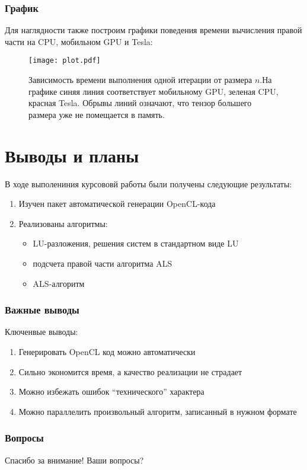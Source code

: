 \documentclass[presentation]{beamer}
\begin{document}
\begin{frame}
\frametitle{График}
\label{sec-3-3}

Для наглядности также построим графики поведения времени вычисления правой части
на CPU, мобильном GPU и Tesla:

\begin{center}

\begin{figure}[H]
\centering
\texttt{[image: plot.pdf]}
\caption{Зависимость времени выполнения одной итерации от размера $n$.На графике синяя линия соответствует мобильному GPU, зеленая CPU, красная Tesla. Обрывы линий означают, что тензор большего размера уже не помещается в память.}
\end{figure}
\end{center}
\end{frame}
\section{Выводы и планы}
\label{sec-4}

В ходе выполениния курсововй работы были получены следующие результаты:
\begin{enumerate}
\item Изучен пакет автоматической генерации OpenCL-кода
\item Реализованы алгоритмы:
\begin{itemize}
\item LU-разложения, решения систем в стандартном виде LU
\item подсчета правой части алгоритма ALS
\item ALS-алгоритм
\end{itemize}
\end{enumerate}
\begin{frame}
\frametitle{Важные выводы}
\label{sec-4-1}

Ключенвые выводы:
\begin{enumerate}
\item Генерировать OpenCL код можно автоматически
\item Сильно экономится время, а качество реализации не страдает
\item Можно избежать ошибок ``технического'' характера
\item Можно параллелить произвольный алгоритм, записанный в нужном формате
\end{enumerate}
\end{frame}
\begin{frame}
\frametitle{Вопросы}
\label{sec-4-2}

Спасибо за внимание!
Ваши вопросы?
\end{frame}
\end{document}
